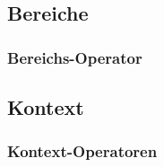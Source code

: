 


\subsection{Bereiche}
\begin{frame}
	\frametitle{Bereichs-Operator}
	
\end{frame}



\subsection{Kontext}
\begin{frame}
	\frametitle{Kontext-Operatoren}
	
\end{frame}








